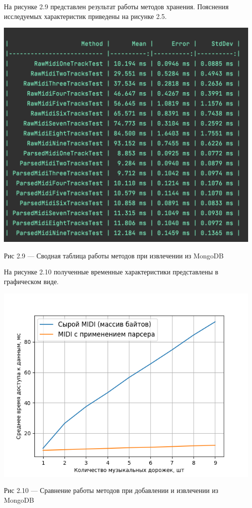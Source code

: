 На рисунке 2.9 представлен результат работы методов хранения. Пояснения исследуемых характеристик приведены на рисунке 2.5.

\begin{center}
		\includegraphics[scale=0.6]{tex/img/InsertFindClean.png}
		
			Рис 2.9 — Сводная таблица работы методов при извлечении из MongoDB
\end{center}

На рисунке 2.10 полученные временные характеристики представлены в графическом виде.

\begin{center}
		\includegraphics[scale=0.7]{tex/img/figure_find_insert_query.png}
		
			Рис 2.10 — Сравнение работы методов при добавлении и извлечении из MongoDB
\end{center}

